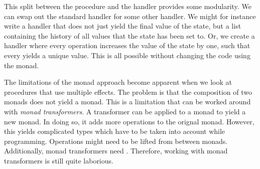 This split between the procedure and the handler provides some modularity. We can swap out the standard  handler for some other handler. We might for instance write a handler that does not just yield the final value of the state, but a list containing the history of all values that the state has been set to. Or, we create a handler where every  operation increases the value of the state by one, such that every  yields a unique value. This is all possible without changing the code using the  monad.

The limitations of the monad approach become apparent when we look at procedures that use multiple effects. The problem is that the composition of two monads does not yield a monad. This is a limitation that can be worked around with \emph{monad transformers}. A transformer can be applied to a monad to yield a new monad. In doing so, it adds more operations to the orignal monad. However, this yields complicated types which have to be taken into account while programming. Operations might need to be lifted from between monads. Additionally, monad transformers need . Therefore, working with monad transformers is still quite laborious.


